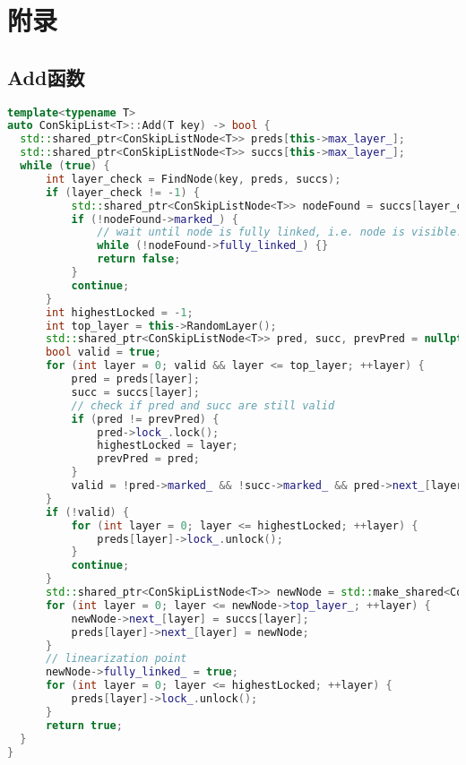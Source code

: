 \documentclass[UTF8, 10pt, twocolumn]{article}
\begin{document}
\onecolumn
\appendix
\section{附录}
\subsection{Add函数}
\begin{lstlisting}[language=c++]
template<typename T>
auto ConSkipList<T>::Add(T key) -> bool {
  std::shared_ptr<ConSkipListNode<T>> preds[this->max_layer_];
  std::shared_ptr<ConSkipListNode<T>> succs[this->max_layer_];
  while (true) {
      int layer_check = FindNode(key, preds, succs);
      if (layer_check != -1) {
          std::shared_ptr<ConSkipListNode<T>> nodeFound = succs[layer_check];
          if (!nodeFound->marked_) {
              // wait until node is fully linked, i.e. node is visible.
              while (!nodeFound->fully_linked_) {}
              return false;
          }
          continue;
      }
      int highestLocked = -1;
      int top_layer = this->RandomLayer();
      std::shared_ptr<ConSkipListNode<T>> pred, succ, prevPred = nullptr;
      bool valid = true;
      for (int layer = 0; valid && layer <= top_layer; ++layer) {
          pred = preds[layer];
          succ = succs[layer];
          // check if pred and succ are still valid
          if (pred != prevPred) {
              pred->lock_.lock();
              highestLocked = layer;
              prevPred = pred;
          }
          valid = !pred->marked_ && !succ->marked_ && pred->next_[layer] == succ;
      }
      if (!valid) {
          for (int layer = 0; layer <= highestLocked; ++layer) {
              preds[layer]->lock_.unlock();
          }
          continue;
      }
      std::shared_ptr<ConSkipListNode<T>> newNode = std::make_shared<ConSkipListNode<T>>(key, top_layer);
      for (int layer = 0; layer <= newNode->top_layer_; ++layer) {
          newNode->next_[layer] = succs[layer];
          preds[layer]->next_[layer] = newNode;
      }
      // linearization point
      newNode->fully_linked_ = true;
      for (int layer = 0; layer <= highestLocked; ++layer) {
          preds[layer]->lock_.unlock();
      }
      return true;
  }
}
\end{lstlisting}
\end{document}
